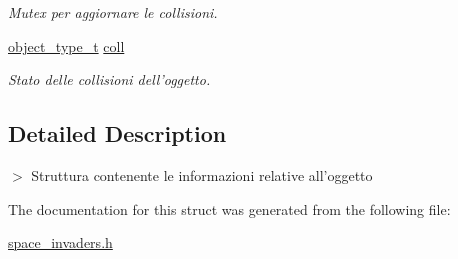 \begin{DoxyCompactItemize}
\begin{DoxyCompactList}\small\item\em Mutex per aggiornare le collisioni. \item\end{DoxyCompactList}\item 
\hypertarget{structobject__data__t_a0dbe2029012617f8ee5f4951f8b5f944}{
\hyperlink{space__invaders_8h_a3af7baddc641a3b4f5a9189b589eccf7}{object\_\-type\_\-t} \hyperlink{structobject__data__t_a0dbe2029012617f8ee5f4951f8b5f944}{coll}}
\label{structobject__data__t_a0dbe2029012617f8ee5f4951f8b5f944}

\begin{DoxyCompactList}\small\item\em Stato delle collisioni dell'oggetto. \item\end{DoxyCompactList}\end{DoxyCompactItemize}


\subsection{Detailed Description}
$>$ Struttura contenente le informazioni relative all'oggetto 

The documentation for this struct was generated from the following file:\begin{DoxyCompactItemize}
\item 
\hyperlink{space__invaders_8h}{space\_\-invaders.h}\end{DoxyCompactItemize}
